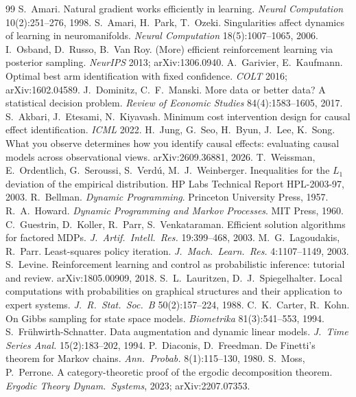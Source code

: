 \documentclass[11pt]{article}
\theoremstyle{definition}
\theoremstyle{remark}
\begin{document}
\begin{thebibliography}{99}
 S.~Amari. Natural gradient works efficiently in learning. \emph{Neural Computation} 10(2):251--276, 1998.
 S.~Amari, H.~Park, T.~Ozeki. Singularities affect dynamics of learning in neuromanifolds. \emph{Neural Computation} 18(5):1007--1065, 2006.
 I.~Osband, D.~Russo, B.~Van Roy. (More) efficient reinforcement learning via posterior sampling. \emph{NeurIPS} 2013; arXiv:1306.0940.
 A.~Garivier, E.~Kaufmann. Optimal best arm identification with fixed confidence. \emph{COLT} 2016; arXiv:1602.04589.
 J.~Dominitz, C.~F.~Manski. More data or better data? A statistical decision problem. \emph{Review of Economic Studies} 84(4):1583--1605, 2017.
 S.~Akbari, J.~Etesami, N.~Kiyavash. Minimum cost intervention design for causal effect identification. \emph{ICML} 2022.
 H.~Jung, G.~Seo, H.~Byun, J.~Lee, K.~Song. What you observe determines how you identify causal effects: evaluating causal models across observational views. arXiv:2609.36881, 2026.
 T.~Weissman, E.~Ordentlich, G.~Seroussi, S.~Verd\'u, M.~J.~Weinberger. Inequalities for the $L_1$ deviation of the empirical distribution. HP Labs Technical Report HPL-2003-97, 2003.
 R.~Bellman. \emph{Dynamic Programming}. Princeton University Press, 1957.
 R.~A.~Howard. \emph{Dynamic Programming and Markov Processes}. MIT Press, 1960.
 C.~Guestrin, D.~Koller, R.~Parr, S.~Venkataraman. Efficient solution algorithms for factored MDPs. \emph{J.\ Artif.\ Intell.\ Res.} 19:399--468, 2003.
 M.~G.~Lagoudakis, R.~Parr. Least-squares policy iteration. \emph{J.\ Mach.\ Learn.\ Res.} 4:1107--1149, 2003.
 S.~Levine. Reinforcement learning and control as probabilistic inference: tutorial and review. arXiv:1805.00909, 2018.
 S.~L.~Lauritzen, D.~J.~Spiegelhalter. Local computations with probabilities on graphical structures and their application to expert systems. \emph{J.\ R.\ Stat.\ Soc.\ B} 50(2):157--224, 1988.
 C.~K.~Carter, R.~Kohn. On Gibbs sampling for state space models. \emph{Biometrika} 81(3):541--553, 1994.
 S.~Fr\"uhwirth-Schnatter. Data augmentation and dynamic linear models. \emph{J.\ Time Series Anal.} 15(2):183--202, 1994.
 P.~Diaconis, D.~Freedman. De Finetti's theorem for Markov chains. \emph{Ann.\ Probab.} 8(1):115--130, 1980.
 S.~Moss, P.~Perrone. A category-theoretic proof of the ergodic decomposition theorem. \emph{Ergodic Theory Dynam.\ Systems}, 2023; arXiv:2207.07353.

\end{thebibliography}
\end{document}
